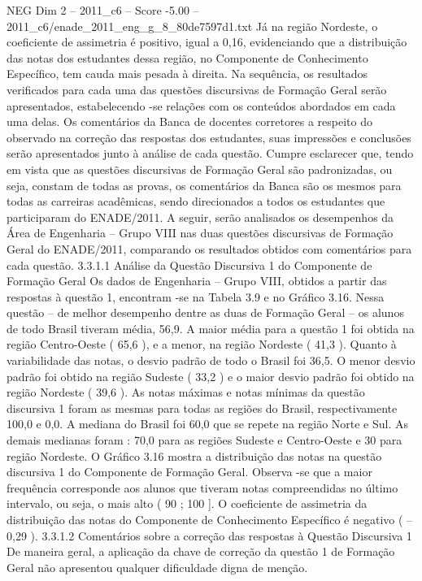 \begin{textsample}{NEG Dim 2 – 2011\_c6 – Score -5.00 – 2011\_c6/enade\_2011\_eng\_g\_8\_80de7597d1.txt}
Já na região Nordeste, o coeficiente de assimetria é positivo, igual a 0,16, evidenciando que a distribuição das notas dos estudantes dessa região, no Componente de Conhecimento Específico, tem cauda mais pesada à direita.
Na sequência, os resultados verificados para cada uma das questões discursivas de Formação Geral serão apresentados, estabelecendo -se relações com os conteúdos abordados em cada uma delas.
Os comentários da Banca de docentes corretores a respeito do observado na correção das respostas dos estudantes, suas impressões e conclusões serão apresentados junto à análise de cada questão.
Cumpre esclarecer que, tendo em vista que as questões discursivas de Formação Geral são padronizadas, ou seja, constam de todas as provas, os comentários da Banca são os mesmos para todas as carreiras acadêmicas, sendo direcionados a todos os estudantes que participaram do ENADE/2011.
A seguir, serão analisados os desempenhos da Área de Engenharia – Grupo VIII nas duas questões discursivas de Formação Geral do ENADE/2011, comparando os resultados obtidos com comentários para cada questão. 3.3.1.1 Análise da Questão Discursiva 1 do Componente de Formação Geral Os dados de Engenharia – Grupo VIII, obtidos a partir das respostas à questão 1, encontram -se na Tabela 3.9 e no Gráfico 3.16.
Nessa questão – de melhor desempenho dentre as duas de Formação Geral – os alunos de todo Brasil tiveram média, 56,9.
A maior média para a questão 1 foi obtida na região Centro-Oeste ( 65,6 ), e a menor, na região Nordeste ( 41,3 ).
Quanto à variabilidade das notas, o desvio padrão de todo o Brasil foi 36,5.
O menor desvio padrão foi obtido na região Sudeste ( 33,2 ) e o maior desvio padrão foi obtido na região Nordeste ( 39,6 ).
As notas máximas e notas mínimas da questão discursiva 1 foram as mesmas para todas as regiões do Brasil, respectivamente 100,0 e 0,0.
A mediana do Brasil foi 60,0 que se repete na região Norte e Sul.
As demais medianas foram : 70,0 para as regiões Sudeste e Centro-Oeste e 30 para região Nordeste.
O Gráfico 3.16 mostra a distribuição das notas na questão discursiva 1 do Componente de Formação Geral.
Observa -se que a maior frequência corresponde aos alunos que tiveram notas compreendidas no último intervalo, ou seja, o mais alto ( 90 ; 100 ].
O coeficiente de assimetria da distribuição das notas do Componente de Conhecimento Específico é negativo ( – 0,29 ). 3.3.1.2 Comentários sobre a correção das respostas à Questão Discursiva 1 De maneira geral, a aplicação da chave de correção da questão 1 de Formação Geral não apresentou qualquer dificuldade digna de menção.

\end{textsample}
